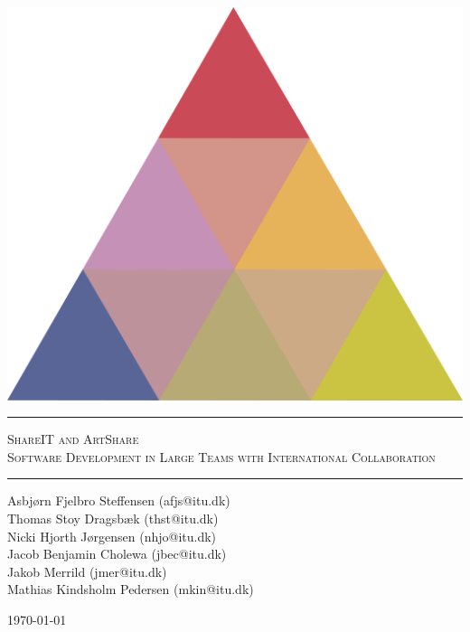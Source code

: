 \begin{titlepage}
\begin{center}

\vspace{2cm}

\includegraphics[scale=0.5]{./img/logo.png}

\rule{\linewidth}{0.6mm}

\textsc{\LARGE ShareIT and ArtShare} \\
\textsc{Software Development in Large Teams with International Collaboration}
\vspace{0.2cm}
\rule{\linewidth}{0.4mm}

Asbj\o rn Fjelbro Steffensen (afjs@itu.dk)\\ Thomas Stoy Dragsb\ae k (thst@itu.dk)\\ Nicki Hjorth J\o rgensen (nhjo@itu.dk)\\ Jacob Benjamin Cholewa (jbec@itu.dk)\\ Jakob Merrild (jmer@itu.dk)\\ Mathias Kindsholm Pedersen (mkin@itu.dk)

\vfill

\large \today
\end{center}


\end{titlepage}